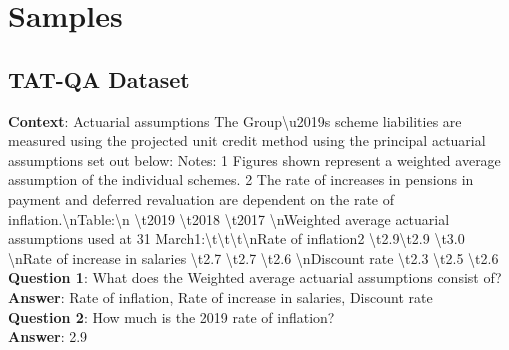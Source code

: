 \documentclass[logo,msc]{infthesis}           %
\begin{document}
\section{Samples}
\label{samples}
\subsection{TAT-QA Dataset}
\begin{tcolorbox}[colback=blue!5!white, %
                 colframe=gray, %
                 fonttitle=\bfseries, %
                 breakable, %
                 sharp corners, %
                 boxsep=10pt, %
                 left=10pt, %
                 right=10pt, %
                 top=10pt, %
                 bottom=10pt, %
                 enlarge left by=-10mm, %
                 enlarge right by=-10mm] %
\label{tat-qa-app}
\textbf{Context}: Actuarial assumptions The Group\textbackslash u2019s scheme liabilities are measured using the projected unit credit method using the principal actuarial assumptions set out below: Notes: 1 Figures shown represent a weighted average assumption of the individual schemes. 2 The rate of increases in pensions in payment and deferred revaluation are dependent on the rate of inflation.\textbackslash nTable:\textbackslash n \textbackslash t2019 \textbackslash t2018 \textbackslash t2017 \textbackslash nWeighted average actuarial assumptions used at 31 March1:\textbackslash t\textbackslash t\textbackslash t\textbackslash nRate of inflation2 \textbackslash t2.9\textbackslash t2.9 \textbackslash t3.0 \textbackslash nRate of increase in salaries \textbackslash t2.7 \textbackslash t2.7 \textbackslash t2.6 \textbackslash nDiscount rate \textbackslash t2.3 \textbackslash t2.5 \textbackslash t2.6 \\
\textbf{Question 1}: What does the Weighted average actuarial assumptions consist of? \\
\textbf{Answer}: Rate of inflation, Rate of increase in salaries, Discount rate \\
\textbf{Question 2}: How much is the 2019 rate of inflation?  \\
\textbf{Answer}: 2.9
\end{tcolorbox}
\end{document}
